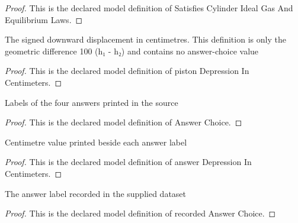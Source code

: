 \begin{proof}
  This is the declared model definition of Satisfies Cylinder Ideal Gas And Equilibrium Laws.
\end{proof}
\begin{definition}
  \label{def:physics:phyx-mini-0360:phyxminiproblems-problemphyxmini0360-pistondepressionincentimeters}
  The signed downward displacement in centimetres. This definition is only the geometric difference 100 (h₁ - h₂) and contains no answer-choice value
\end{definition}
\begin{proof}
  This is the declared model definition of piston Depression In Centimeters.
\end{proof}
\begin{definition}
  \label{def:physics:phyx-mini-0360:phyxminiproblems-problemphyxmini0360-answerchoice}
  Labels of the four answers printed in the source
\end{definition}
\begin{proof}
  This is the declared model definition of Answer Choice.
\end{proof}
\begin{definition}
  \label{def:physics:phyx-mini-0360:phyxminiproblems-problemphyxmini0360-answerdepressionincentimeters}
  Centimetre value printed beside each answer label
\end{definition}
\begin{proof}
  This is the declared model definition of answer Depression In Centimeters.
\end{proof}
\begin{definition}
  \label{def:physics:phyx-mini-0360:phyxminiproblems-problemphyxmini0360-recordedanswerchoice}
  The answer label recorded in the supplied dataset
\end{definition}
\begin{proof}
  This is the declared model definition of recorded Answer Choice.
\end{proof}
